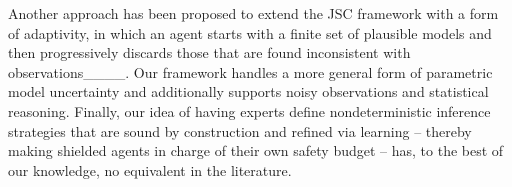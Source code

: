 Another approach has been proposed to extend the JSC framework with a form of adaptivity, in which an agent starts with a finite set of plausible models and then progressively discards those that are found inconsistent with observations____. Our framework handles a more general form of parametric model uncertainty and additionally supports noisy observations and statistical reasoning. Finally, our idea of having experts define nondeterministic inference strategies that are sound by construction and refined via learning -- thereby making shielded agents in charge of their own safety budget -- has, to the best of our knowledge, no equivalent in the literature.